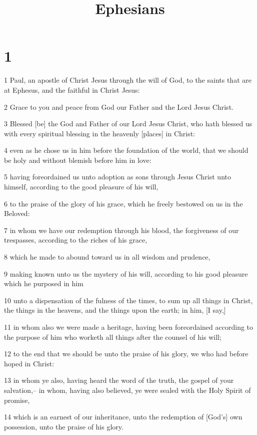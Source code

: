 

\title{Ephesians}

\chapter{1}

\par 1 Paul, an apostle of Christ Jesus through the will of God, to the saints that are at Ephesus, and the faithful in Christ Jesus:
\par 2 Grace to you and peace from God our Father and the Lord Jesus Christ.
\par 3 Blessed [be] the God and Father of our Lord Jesus Christ, who hath blessed us with every spiritual blessing in the heavenly [places] in Christ:
\par 4 even as he chose us in him before the foundation of the world, that we should be holy and without blemish before him in love:
\par 5 having foreordained us unto adoption as sons through Jesus Christ unto himself, according to the good pleasure of his will,
\par 6 to the praise of the glory of his grace, which he freely bestowed on us in the Beloved:
\par 7 in whom we have our redemption through his blood, the forgiveness of our trespasses, according to the riches of his grace,
\par 8 which he made to abound toward us in all wisdom and prudence,
\par 9 making known unto us the mystery of his will, according to his good pleasure which he purposed in him
\par 10 unto a dispensation of the fulness of the times, to sum up all things in Christ, the things in the heavens, and the things upon the earth; in him, [I say,]
\par 11 in whom also we were made a heritage, having been foreordained according to the purpose of him who worketh all things after the counsel of his will;
\par 12 to the end that we should be unto the praise of his glory, we who had before hoped in Christ:
\par 13 in whom ye also, having heard the word of the truth, the gospel of your salvation,-- in whom, having also believed, ye were sealed with the Holy Spirit of promise,
\par 14 which is an earnest of our inheritance, unto the redemption of [God's] own possession, unto the praise of his glory.
